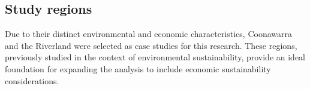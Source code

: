 \documentclass{article}
\begin{document}

\subsection{Study regions}
Due to their distinct environmental and economic characteristics, Coonawarra and the Riverland were selected as case studies for this research. These regions, previously studied in the context of environmental sustainability, provide an ideal foundation for expanding the analysis to include economic sustainability considerations.
\end{document}
